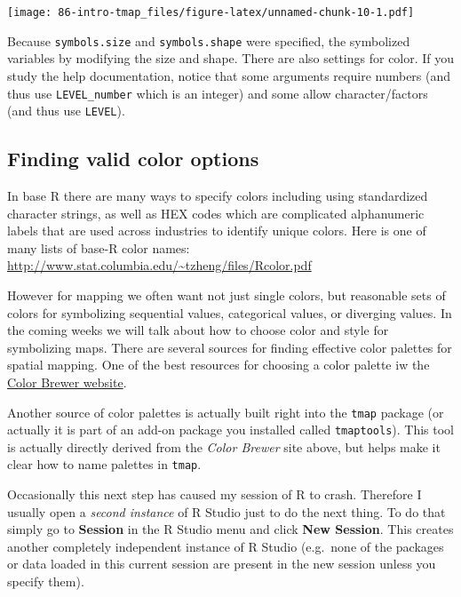 \documentclass[
]{book}
\newenvironment{rmdcaution}[1]
  {
  \begin{itemize}
  \renewcommand{\labelitemi}{
    \raisebox{-.7\height}[0pt][0pt]{
      {\setkeys{Gin}{width=3em,keepaspectratio}\texttt{[image: images/\#1]}}
    }
  }
  \setlength{\fboxsep}{1em}
  \begin{caution}
  \item
  }
  {
  \end{caution}
  \end{itemize}
  }
\begin{document}
\texttt{[image: 86-intro-tmap\_files/figure-latex/unnamed-chunk-10-1.pdf]}

Because \texttt{symbols.size} and \texttt{symbols.shape} were specified, the symbolized variables by modifying the size and shape. There are also settings for color. If you study the help documentation, notice that some arguments require numbers (and thus use \texttt{LEVEL\_number} which is an integer) and some allow character/factors (and thus use \texttt{LEVEL}).

\hypertarget{finding-valid-color-options}{%
\subsection{Finding valid color options}\label{finding-valid-color-options}}

In base R there are many ways to specify colors including using standardized character strings, as well as HEX codes which are complicated alphanumeric labels that are used across industries to identify unique colors. Here is one of many lists of base-R color names: \url{http://www.stat.columbia.edu/~tzheng/files/Rcolor.pdf}

However for mapping we often want not just single colors, but reasonable sets of colors for symbolizing sequential values, categorical values, or diverging values. In the coming weeks we will talk about how to choose color and style for symbolizing maps. There are several sources for finding effective color palettes for spatial mapping. One of the best resources for choosing a color palette iw the \href{https://colorbrewer2.org/\#type=sequential\&scheme=BuGn\&n=3}{Color Brewer website}.

Another source of color palettes is actually built right into the \texttt{tmap} package (or actually it is part of an add-on package you installed called \texttt{tmaptools}). This tool is actually directly derived from the \emph{Color Brewer} site above, but helps make it clear how to name palettes in \texttt{tmap}.

\begin{rmdcaution}{caution}
Occasionally this next step has caused my session of R to crash. Therefore I usually open a \emph{second instance} of R Studio just to do the next thing. To do that simply go to \textbf{Session} in the R Studio menu and click \textbf{New Session}. This creates another completely independent instance of R Studio (e.g.~none of the packages or data loaded in this current session are present in the new session unless you specify them).

\end{rmdcaution}
\end{document}
